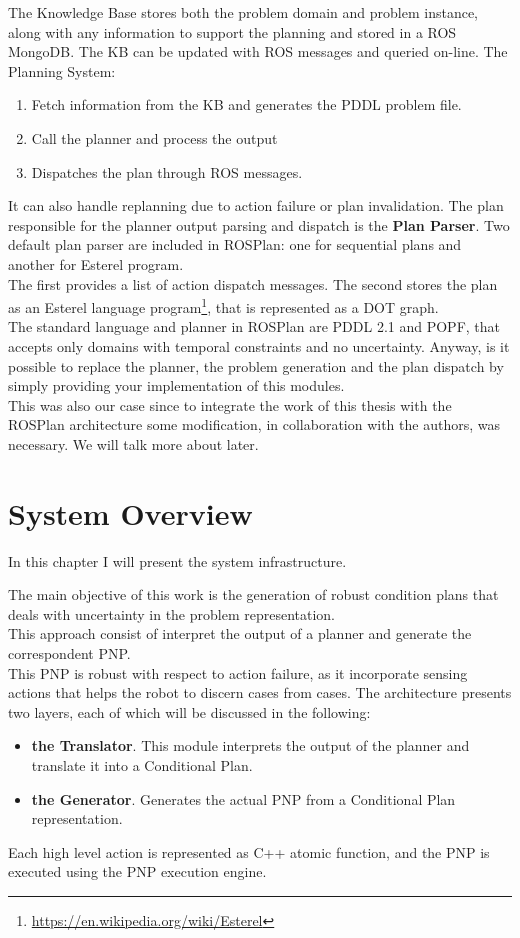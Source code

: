 \documentclass[pdftex,12pt,a4paper]{report}
\begin{document}
\noindent The Knowledge Base stores both the problem domain and problem instance, along with any information to support the planning and stored in a ROS MongoDB. The KB can be updated with ROS messages and queried on-line.
\newpage
\noindent The Planning System:
\begin{enumerate}
\item Fetch information from the KB and generates the PDDL problem file.
\item Call the planner and process the output
\item Dispatches the plan through ROS messages.
\end{enumerate}  
It can also handle replanning due to action failure or plan invalidation. The plan responsible for the planner output parsing and dispatch is the \textbf{Plan Parser}. Two default plan parser are included in ROSPlan: one for sequential plans and another for Esterel program. \\
The first provides a list of action dispatch messages. The second stores the plan as an Esterel language program\footnote{\url{https://en.wikipedia.org/wiki/Esterel}}, that is represented as a DOT graph. \\

\noindent The standard language and planner in ROSPlan are PDDL 2.1 and POPF\cite{coles2010forward},%
that accepts only domains with temporal constraints and no uncertainty. 
Anyway, is it possible to replace the planner, the problem generation and the plan dispatch by simply providing your implementation of this modules.\\
This was also our case since to integrate the work of this thesis with the ROSPlan architecture some modification, in collaboration with the authors, was necessary. We will talk more about later.

\chapter{System Overview}\label{sec:system}
In this chapter I will present the system infrastructure.\\
\newline

\noindent The main objective of this work is the generation of robust condition plans that deals with uncertainty in the problem representation.\\
This approach consist of interpret the output of a planner and generate the correspondent PNP.\\
This PNP is robust with respect to action failure, as it incorporate sensing actions that helps the robot to discern cases from cases.
The architecture presents two layers, each of which will be discussed in the following:
\begin{itemize}
\item \textbf{the Translator}. This module interprets the output of the planner and translate it into a Conditional Plan.
\item \textbf{the Generator}. Generates the actual PNP from a Conditional Plan representation.
\end{itemize}
Each high level action is represented as C++ atomic function, and the PNP is executed using the PNP execution engine.
\end{document}
